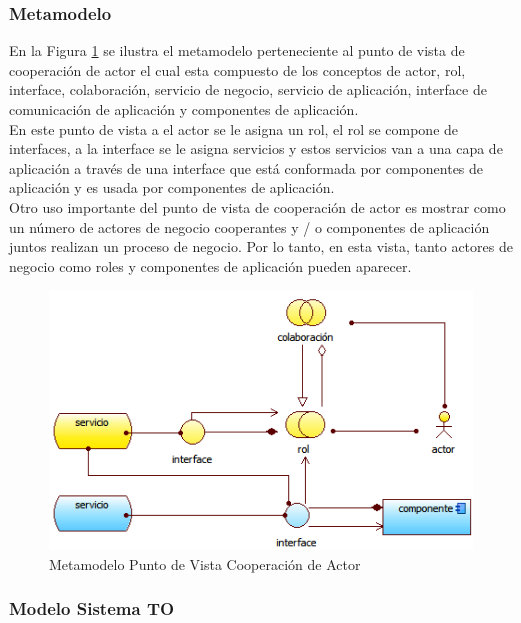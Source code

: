     \subsubsection{Metamodelo}
    En la Figura \ref{metamodelo2} se ilustra el metamodelo perteneciente al punto de vista de cooperación de actor el cual esta compuesto de los conceptos de actor, rol,  interface, colaboración, servicio de negocio, servicio de aplicación, interface de comunicación de aplicación y componentes de aplicación.\\
    En este punto de vista a el actor se le asigna un rol, el rol se compone de interfaces, a la interface se le asigna servicios y estos servicios van a una capa de aplicación a  través de una interface que está conformada por componentes de aplicación y es usada por componentes de aplicación. \\
    Otro uso importante del punto de vista de cooperación de actor es mostrar como un número de actores de negocio cooperantes y / o componentes de aplicación juntos realizan un   proceso de negocio. Por lo tanto, en esta vista, tanto actores de negocio como roles y componentes de aplicación pueden aparecer. \cite{ref9}
    \begin{figure}[h]
      \centering
      \includegraphics{Imagenes/Metamodelos/02}
      \caption{Metamodelo Punto de Vista Cooperación de Actor \cite{ref9}}
      \label{metamodelo2}
    \end{figure}
    \subsubsection{Modelo Sistema TO}
